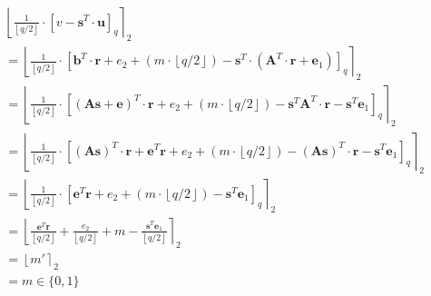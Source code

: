 \begin{align*}
   & \left\lfloor \frac{1}{\left\lfloor q/2\right\rfloor}\cdot \left[v-\textbf{s}^T \cdot \textbf{u}\right]_q\right\rceil _2                                                                                                                                        \\
   & = \left\lfloor \frac{1}{\left\lfloor q/2\right\rfloor}\cdot \left[\textbf{b}^T \cdot \textbf{r} + e_2 + (m\cdot \left\lfloor q/2\right\rfloor)-\textbf{s}^T \cdot (\textbf{A}^T \cdot \textbf{r} + \textbf{e}_1)\right]_q \right\rceil _2                      \\
   & = \left\lfloor \frac{1}{\left\lfloor q/2\right\rfloor}\cdot \left[(\textbf{As}+\textbf{e})^T \cdot \textbf{r} + e_2 + (m\cdot \left\lfloor q/2\right\rfloor)-\textbf{s}^T \textbf{A}^T \cdot \textbf{r} - \textbf{s}^T \textbf{e}_1\right]_q \right\rceil _2   \\
   & = \left\lfloor \frac{1}{\left\lfloor q/2\right\rfloor}\cdot \left[(\textbf{As})^T \cdot \textbf{r} + \textbf{e}^T\textbf{r}+ e_2 + (m\cdot \left\lfloor q/2\right\rfloor)-(\textbf{As})^T \cdot \textbf{r} - \textbf{s}^T \textbf{e}_1\right]_q\right\rceil _2 \\
   & = \left\lfloor \frac{1}{\left\lfloor q/2\right\rfloor}\cdot \left[\textbf{e}^T\textbf{r}+ e_2 + (m\cdot \left\lfloor q/2\right\rfloor)- \textbf{s}^T \textbf{e}_1\right]_q\right\rceil _2                                                                      \\
   & = \left\lfloor \frac{\textbf{e}^T\textbf{r}}{\left\lfloor q/2\right\rfloor}+ \frac{e_2 }{\left\lfloor q/2\right\rfloor}+ m - \frac{\textbf{s}^T \textbf{e}_1}{\left\lfloor q/2\right\rfloor}\right\rceil _2                                                    \\
   & = \left\lfloor m' \right\rceil _2                                                                                                                                                                                                                              \\
   & = m \in \{0,1\}
\end{align*}

